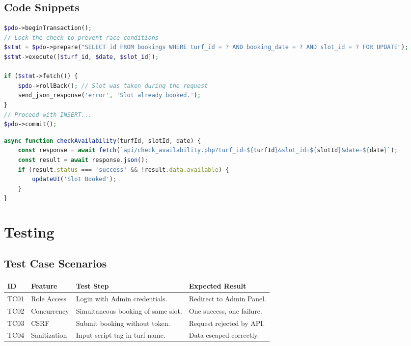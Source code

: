 \documentclass[12pt,a4paper]{report}
\begin{document}
\section{Code Snippets}
\begin{lstlisting}[language=PHP, caption=Secure Booking Transaction]
$pdo->beginTransaction();
// Lock the check to prevent race conditions
$stmt = $pdo->prepare("SELECT id FROM bookings WHERE turf_id = ? AND booking_date = ? AND slot_id = ? FOR UPDATE");
$stmt->execute([$turf_id, $date, $slot_id]);

if ($stmt->fetch()) {
    $pdo->rollBack(); // Slot was taken during the request
    send_json_response('error', 'Slot already booked.');
}
// Proceed with INSERT...
$pdo->commit();
\end{lstlisting}

\begin{lstlisting}[language=JavaScript, caption=AJAX Availability Check]
async function checkAvailability(turfId, slotId, date) {
    const response = await fetch(`api/check_availability.php?turf_id=${turfId}&slot_id=${slotId}&date=${date}`);
    const result = await response.json();
    if (result.status === 'success' && !result.data.available) {
        updateUI('Slot Booked');
    }
}
\end{lstlisting}

\chapter{Testing}
\section{Test Case Scenarios}
\begin{longtable}{|p{1.2cm}|p{3.5cm}|p{4.5cm}|p{3.5cm}|}
\hline
\textbf{ID} & \textbf{Feature} & \textbf{Test Step} & \textbf{Expected Result} \\ \hline
TC01 & Role Access & Login with Admin credentials. & Redirect to Admin Panel. \\ \hline
TC02 & Concurrency & Simultaneous booking of same slot. & One success, one failure. \\ \hline
TC03 & CSRF & Submit booking without token. & Request rejected by API. \\ \hline
TC04 & Sanitization & Input script tag in turf name. & Data escaped correctly. \\ \hline
\end{longtable}
\end{document}
